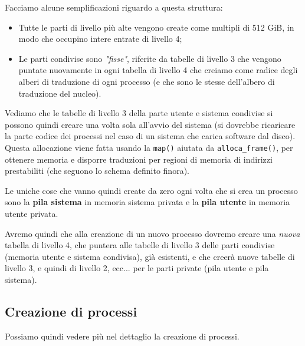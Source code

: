 \documentclass[a4paper,11pt]{article}
\begin{document}
Facciamo alcune semplificazioni riguardo a questa struttura:
\begin{itemize}
	\item Tutte le parti di livello più alte vengono create come multipli di 512 GiB, in modo che occupino intere entrate di livello 4;
	\item Le parti condivise sono \textit{"fisse"}, riferite da tabelle di livello 3 che vengono puntate nuovamente in ogni tabella di livello 4 che creiamo come radice degli alberi di traduzione di ogni processo (e che sono le stesse dell'albero di traduzione del nucleo). 
\end{itemize}

Vediamo che le tabelle di livello 3 della parte utente e sistema condivise si possono quindi creare una volta sola all'avvio del sistema (si dovrebbe ricaricare la parte codice dei processi nel caso di un sistema che carica software dal disco).
Questa allocazione viene fatta usando la \lstinline|map()| aiutata da \lstinline|alloca_frame()|, per ottenere memoria e disporre traduzioni per regioni di memoria di indirizzi prestabiliti (che seguono lo schema definito finora). 

Le uniche cose che vanno quindi create da zero ogni volta che si crea un processo sono la \textbf{pila sistema} in memoria sistema privata e la \textbf{pila utente} in memoria utente privata.

Avremo quindi che alla creazione di un nuovo processo dovremo creare una \textit{nuova} tabella di livello 4, che puntera alle tabelle di livello 3 delle parti condivise (memoria utente e sistema condivisa), già esistenti, e che creerà nuove tabelle di livello 3, e quindi di livello 2, ecc... per le parti private (pila utente e pila sistema).

\subsection{Creazione di processi}
Possiamo quindi vedere più nel dettaglio la creazione di processi.
\end{document}
